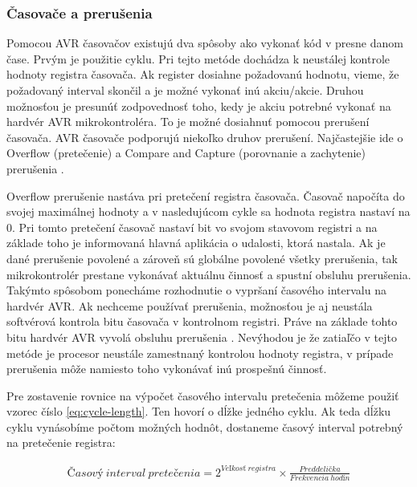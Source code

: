 \subsubsection{Časovače a prerušenia} \label{subsec:timers-interrupts}
Pomocou AVR časovačov existujú dva spôsoby ako vykonať kód v presne danom čase. Prvým je použitie cyklu.
Pri tejto metóde dochádza k neustálej kontrole hodnoty registra časovača. Ak register dosiahne požadovanú hodnotu, vieme, že požadovaný interval skončil
a je možné vykonať inú akciu/akcie. Druhou možnosťou je presunúť zodpovednosť toho, kedy je akciu potrebné vykonať na hardvér AVR mikrokontroléra.
To je možné dosiahnuť pomocou prerušení časovača. AVR časovače podporujú niekoľko druhov prerušení.
Najčastejšie ide o Overflow (pretečenie) a Compare and Capture (porovnanie a zachytenie) prerušenia \cite{atmelATmega64012801281}. \par
Overflow prerušenie nastáva pri pretečení registra časovača. Časovač napočíta do svojej maximálnej hodnoty a v nasledujúcom cykle sa hodnota registra nastaví na 0.
Pri tomto pretečení časovač nastaví bit vo svojom stavovom registri a na základe toho je informovaná hlavná aplikácia o udalosti, ktorá nastala. Ak je dané prerušenie
povolené a zároveň sú globálne povolené všetky prerušenia, tak mikrokontrolér prestane vykonávať aktuálnu činnosť a spustní obsluhu prerušenia. Takýmto spôsobom
ponecháme rozhodnutie o vypršaní časového intervalu na hardvér AVR. Ak nechceme používať prerušenia, možnosťou je aj neustála softvérová kontrola bitu časovača v kontrolnom registri.
Práve na základe tohto bitu hardvér AVR vyvolá obsluhu prerušenia \cite{atmelATmega64012801281}. Nevýhodou je že zatiaľčo v tejto metóde je procesor neustále zamestnaný kontrolou
hodnoty registra, v prípade prerušenia môže namiesto toho vykonávať inú prospešnú činnosť. \par
Pre zostavenie rovnice na výpočet časového intervalu pretečenia môžeme použiť vzorec číslo \ref{eq:cycle-length}. Ten hovorí o dĺžke jedného cyklu. Ak teda dĺžku cyklu
vynásobíme počtom možných hodnôt, dostaneme časový interval potrebný na pretečenie registra:

\begin{equation} \label{eq:overflow-frequency}
    \begin{aligned}
        Časový\:interval\:pretečenia =  2^{Veľkosť\:registra}  \times \frac{Preddelička}{Frekvencia\:hodín}
    \end{aligned}
\end{equation}

